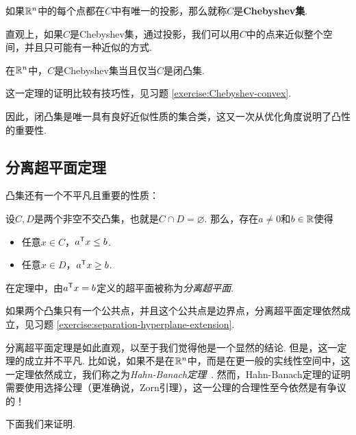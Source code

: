 如果$\mathbb{R}^n$中的每个点都在$C$中有唯一的投影，那么就称$C$是\textbf{Chebyshev集}. 

直观上，如果$C$是Chebyshev集，通过投影，我们可以用$C$中的点来近似整个空间，并且只可能有一种近似的方式. 

\begin{theorem}\label{theorem:Chebyshev-convex}
    在$\mathbb{R}^n$中，$C$是Chebyshev集当且仅当$C$是闭凸集.
\end{theorem}
这一定理的证明比较有技巧性，见习题 \ref{exercise:Chebyshev-convex}.

因此，闭凸集是唯一具有良好近似性质的集合类，这又一次从优化角度说明了凸性的重要性.

\subsection{分离超平面定理}

凸集还有一个不平凡且重要的性质：
\begin{theorem}[分离超平面定理]\label{theorem:separation-hyperplane}
设$C,D$是两个非空不交凸集，也就是$C\cap D=\varnothing$. 那么，存在$a\neq 0$和$b\in\mathbb{R}$使得
\begin{itemize}
    \item 任意$x\in C$，$a^{\mathsf{T}} x\leq b$.
    \item 任意$x\in D$，$a^{\mathsf{T}} x\geq b$.
\end{itemize}
\end{theorem}

在定理中，由$a^{\mathsf{T}} x=b$定义的超平面被称为\textit{分离超平面}.

如果两个凸集只有一个公共点，并且这个公共点是边界点，分离超平面定理依然成立，见习题 \ref{exercise:separation-hyperplane-extension}.

\begin{remark}
    分离超平面定理是如此直观，以至于我们觉得他是一个显然的结论. 但是，这一定理的成立并不平凡. 比如说，如果不是在$\mathbb{R}^n$中，而是在更一般的实线性空间中，这一定理依然成立，我们称之为\textit{Hahn-Banach定理}~\cite{taoHahnBanachTheoremMengers2007}. 然而，Hahn-Banach定理的证明需要使用选择公理（更准确说，Zorn引理），这一公理的合理性至今依然是有争议的！
\end{remark}

下面我们来证明.

